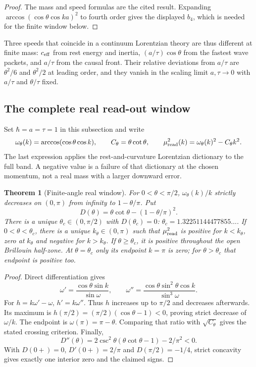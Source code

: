 \documentclass[12pt,a4paper]{article}
\newtheorem{theorem}{Theorem}[section]
\theoremstyle{definition}
\theoremstyle{remark}
\begin{document}
\begin{proof}
The mass and speed formulas are the cited result. Expanding
$\arccos(\cos\theta\cos ka)^2$ to fourth order gives the displayed $b_4$,
which is needed for the finite window below.
\end{proof}

Three speeds that coincide in a continuum Lorentzian theory are thus different at finite mass: $c_{\rm eff}$ from rest energy and inertia, $(a/\tau)\cos\theta$ from the fastest wave packets, and $a/\tau$ from the causal front. Their relative deviations from $a/\tau$ are $\theta^2/6$ and $\theta^2/2$ at leading order, and they vanish in the scaling limit $a,\tau\to0$ with $a/\tau$ and $\theta/\tau$ fixed.

\subsection{The complete real read-out window}
\label{sec:window}

Set $\hbar=a=\tau=1$ in this subsection and write
\[
 \omega_\theta(k)=\arccos(\cos\theta\cos k),\qquad
 C_\theta=\theta\cot\theta,\qquad
 \mu_{\rm read}^2(k)=\omega_\theta(k)^2-C_\theta k^2 .
\]
The last expression applies the rest-and-curvature Lorentzian dictionary to the full band. A negative value is a failure of that dictionary at the chosen momentum, not a real mass with a larger downward error.

\begin{theorem}[Finite-angle real window]\label{thm:window}
For $0<\theta<\pi/2$, $\omega_\theta(k)/k$ strictly decreases on $(0,\pi)$ from infinity to $1-\theta/\pi$. Put
\[
 D(\theta)=\theta\cot\theta-(1-\theta/\pi)^2 .
\]
There is a unique $\theta_c\in(0,\pi/2)$ with $D(\theta_c)=0$:
$\theta_c=1.32251144477855\ldots$.
If $0<\theta<\theta_c$, there is a unique $k_\theta\in(0,\pi)$ such that $\mu_{\rm read}^2$ is positive for $k<k_\theta$, zero at $k_\theta$ and negative for $k>k_\theta$. If $\theta\ge\theta_c$, it is positive throughout the open Brillouin half-zone. At $\theta=\theta_c$ only its endpoint $k=\pi$ is zero; for $\theta>\theta_c$ that endpoint is positive too.
\end{theorem}
\begin{proof}
Direct differentiation gives
\[
 \omega'=\frac{\cos\theta\sin k}{\sin\omega},\qquad
 \omega''=\frac{\cos\theta\sin^2\theta\cos k}{\sin^3\omega}.
\]
For $h=k\omega'-\omega$, $h'=k\omega''$. Thus $h$ increases up to $\pi/2$ and decreases afterwards. Its maximum is
$h(\pi/2)=(\pi/2)(\cos\theta-1)<0$, proving strict decrease of $\omega/k$. The endpoint is $\omega(\pi)=\pi-\theta$. Comparing that ratio with $\sqrt{C_\theta}$ gives the stated crossing criterion. Finally,
\[
 D''(\theta)=2\csc^2\theta(\theta\cot\theta-1)-2/\pi^2<0 .
\]
With $D(0+)=0$, $D'(0+)=2/\pi$ and $D(\pi/2)=-1/4$, strict concavity gives exactly one interior zero and the claimed signs.
\end{proof}
\end{document}
